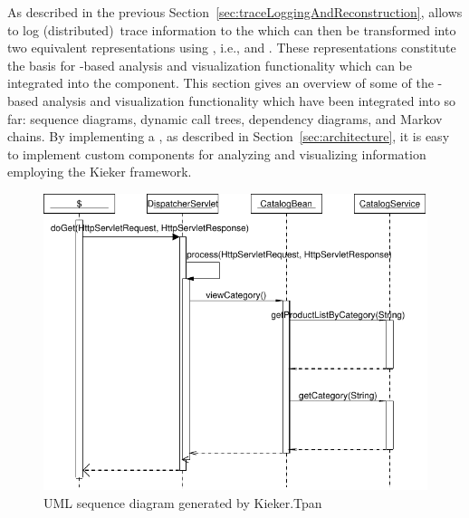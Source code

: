 \noindent As described in the previous Section~\ref{sec:traceLoggingAndReconstruction}, %
\KiekerTpmon{} allows to log (distributed)~trace information to the \MonitoringLog{} %
which can then be transformed into two equivalent \trace{} representations using %
\KiekerTpan{}, i.e., \executionTraces{} and \messageTraces{}. %
These representations constitute the basis for \trace{}-based analysis and 
visualization functionality which can be integrated into the \KiekerTpan{} %
component. %
This section gives an overview of some of the \trace{}-based analysis and visualization %
functionality which have been integrated into \KiekerTpan{} so far: sequence diagrams, dynamic call trees, dependency diagrams, and Markov chains. %
By implementing a \MonitoringRecordConsumer{}, as described in Section~\ref{sec:architecture}, %
it is easy to implement custom components for analyzing and visualizing \trace{} %
information employing the Kieker framework.

%
% 

\begin{figure}\centering
\includegraphics[width=\columnwidth]{figures/20090710-163529-jpetstore-250Threads-400sDuration-200sRampup-sequenceDiagram-19503}%
\caption{UML sequence diagram generated by Kieker.Tpan}
\label{fig:vis:jpetSeqDiagr}
\end{figure}

